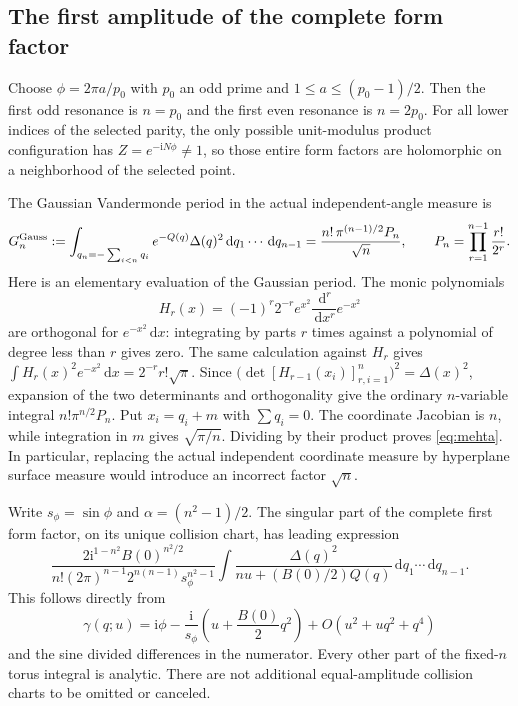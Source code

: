 \documentclass[11pt]{article}
\numberwithin{equation}{section}
\theoremstyle{definition}
\newcommand{\dd}{\,\mathrm d}
\newcommand{\ii}{\mathrm i}
\begin{document}
\subsection{The first amplitude of the complete form factor}
Choose $\phi=2\pi a/p_0$ with $p_0$ an odd prime and
$1\le a\le(p_0-1)/2$. Then the first odd resonance is $n=p_0$ and
the first even resonance is $n=2p_0$. For all lower indices of the
selected parity, the only possible unit-modulus product configuration
has $Z=e^{-\ii N\phi}\ne1$, so those entire form factors are
holomorphic on a neighborhood of the selected point.

The Gaussian Vandermonde period in the actual independent-angle measure
is
\begin{equation}\label{eq:mehta}
 G_n^{\rm Gauss}:=
 \int_{q_n=-\sum_{i<n}q_i}e^{-Q(q)}\Delta(q)^2
                         \dd q_1\cdots\dd q_{n-1}
 =\frac{n!\,\pi^{(n-1)/2}P_n}{\sqrt n},\qquad
 P_n=\prod_{r=1}^{n-1}\frac{r!}{2^r}.
\end{equation}
Here is an elementary evaluation of the Gaussian period. The monic
polynomials
\[
 H_r(x)=(-1)^r2^{-r}e^{x^2}\frac{\dd^r}{\dd x^r}e^{-x^2}
\]
are orthogonal for $e^{-x^2}\dd x$: integrating by parts $r$ times
against a polynomial of degree less than $r$ gives zero. The same
calculation against $H_r$ gives
$\int H_r(x)^2e^{-x^2}\dd x=2^{-r}r!\sqrt\pi$.
Since $\bigl(\det[H_{r-1}(x_i)]_{r,i=1}^n\bigr)^2=\Delta(x)^2$, expansion of
the two determinants and orthogonality give the ordinary
$n$-variable integral $n!\pi^{n/2}P_n$.
Put $x_i=q_i+m$ with $\sum q_i=0$. The coordinate Jacobian is $n$,
while integration in $m$ gives $\sqrt{\pi/n}$. Dividing by their
product proves \eqref{eq:mehta}. In particular, replacing the actual independent
coordinate measure by hyperplane surface measure would introduce an
incorrect factor $\sqrt n$.

Write $s_\phi=\sin\phi$ and $\alpha=(n^2-1)/2$. The singular part
of the complete first form factor, on its unique collision chart, has
leading expression
\begin{equation}\label{eq:leadingintegral}
 \frac{2\ii^{1-n^2}B(0)^{n^2/2}}
 {n!(2\pi)^{n-1}2^{n(n-1)}s_\phi^{n^2-1}}
 \int\frac{\Delta(q)^2}{nu+(B(0)/2)Q(q)}
                                   \dd q_1\cdots\dd q_{n-1}.
\end{equation}
This follows directly from
\[
 \gamma(q;u)=\ii\phi-\frac{\ii}{s_\phi}
                  \left(u+\frac{B(0)}2q^2\right)
                  +O(u^2+u q^2+q^4)
\]
and the sine divided differences in the numerator. Every other part of
the fixed-$n$ torus integral is analytic. There are not additional
equal-amplitude collision charts to be omitted or canceled.
\end{document}
